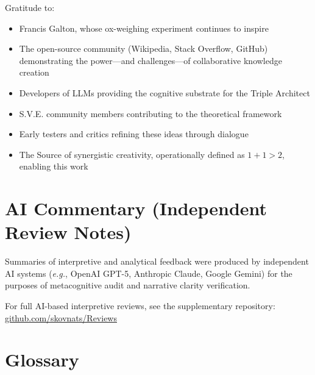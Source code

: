 \documentclass[11pt,a4paper]{article}
\theoremstyle{definition}
\theoremstyle{remark}
\begin{document}
Gratitude to:
\begin{itemize}
    \item Francis Galton, whose ox-weighing experiment continues to inspire
    \item The open-source community (Wikipedia, Stack Overflow, GitHub) demonstrating the power—and challenges—of collaborative knowledge creation
    \item Developers of LLMs providing the cognitive substrate for the Triple Architect
    \item S.V.E. community members contributing to the theoretical framework
    \item Early testers and critics refining these ideas through dialogue
    \item The Source of synergistic creativity, operationally defined as $1+1>2$, enabling this work
\end{itemize}

\section*{AI Commentary (Independent Review Notes)}
Summaries of interpretive and analytical feedback were produced by independent AI systems 
(\textit{e.g.}, OpenAI GPT-5, Anthropic Claude, Google Gemini) 
for the purposes of metacognitive audit and narrative clarity verification.  

For full AI-based interpretive reviews, see the supplementary repository:  
\href{https://codeberg.org/skovnats/SVE-Systemic-Verification-Engineering/tree/master/Reviews}{github.com/skovnats/Reviews}





\appendix

\section{Glossary}
\end{document}
